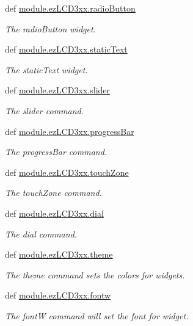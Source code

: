 \begin{DoxyCompactItemize}
def \hyperlink{group___widgets_gaef2c149d7df7f92b718a8660fd0db245}{module.\-ez\-L\-C\-D3xx.\-radio\-Button}
\begin{DoxyCompactList}\small\item\em The radio\-Button widget. \end{DoxyCompactList}\item 
def \hyperlink{group___widgets_gacee37e549f8a877a715b68d39460f7b7}{module.\-ez\-L\-C\-D3xx.\-static\-Text}
\begin{DoxyCompactList}\small\item\em The static\-Text widget. \end{DoxyCompactList}\item 
def \hyperlink{group___widgets_ga93ee96540f5ffc5c4704f60592074d80}{module.\-ez\-L\-C\-D3xx.\-slider}
\begin{DoxyCompactList}\small\item\em The slider command. \end{DoxyCompactList}\item 
def \hyperlink{group___widgets_ga9eeb62ec0060e5ba57e42986b2d555ae}{module.\-ez\-L\-C\-D3xx.\-progress\-Bar}
\begin{DoxyCompactList}\small\item\em The progress\-Bar command. \end{DoxyCompactList}\item 
def \hyperlink{group___widgets_gaeb901f189e33956b4cd51fbd78bcf957}{module.\-ez\-L\-C\-D3xx.\-touch\-Zone}
\begin{DoxyCompactList}\small\item\em The touch\-Zone command. \end{DoxyCompactList}\item 
def \hyperlink{group___widgets_ga0122f7d8c41bb07221be8a778ca8fd53}{module.\-ez\-L\-C\-D3xx.\-dial}
\begin{DoxyCompactList}\small\item\em The dial command. \end{DoxyCompactList}\item 
def \hyperlink{group___widgets_ga334488d30595cf0dd9e2742c65558e2c}{module.\-ez\-L\-C\-D3xx.\-theme}
\begin{DoxyCompactList}\small\item\em The theme command sets the colors for widgets. \end{DoxyCompactList}\item 
def \hyperlink{group___widgets_ga0efc2d431900e2b77a30e19bb556fb3a}{module.\-ez\-L\-C\-D3xx.\-fontw}
\begin{DoxyCompactList}\small\item\em The font\-W command will set the font for widget. \end{DoxyCompactList}\item 

\end{DoxyCompactItemize}
